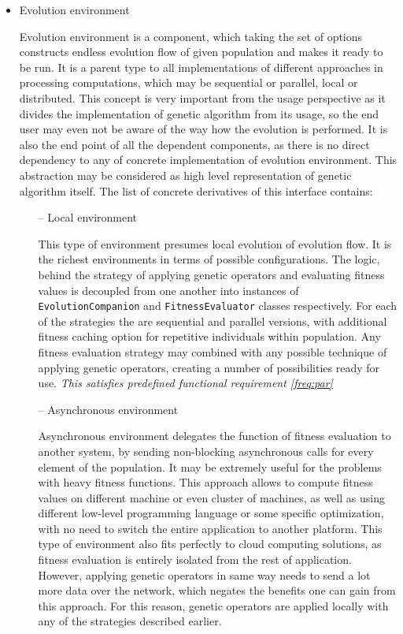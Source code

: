 \begin{itemize}
\item
Evolution environment

Evolution environment is a component, which taking the set of options constructs endless evolution flow of given population and makes it ready to be run. It is a parent type to all implementations of different approaches in processing computations, which may be sequential or parallel, local or distributed. This concept is very important from the usage perspective as it divides the implementation of genetic algorithm from its usage, so the end user may even not be aware of the way how the evolution is performed. It is also the end point of all the dependent components, as there is no direct dependency to any of concrete implementation of evolution environment. This abstraction may be considered as high level representation of genetic algorithm itself. The list of concrete derivatives of this interface contains:
\begin{itemize}
\item[--]
Local environment

This type of environment presumes local evolution of evolution flow. It is the richest environments in terms of possible configurations. The logic, behind the strategy of applying genetic operators and evaluating fitness values is decoupled from one another into instances of \texttt{EvolutionCompanion} and \texttt{FitnessEvaluator} classes respectively. For each of the strategies the are sequential and parallel versions, with additional fitness caching option for repetitive individuals within population. Any fitness evaluation strategy may combined with any possible technique of applying genetic operators, creating a number of possibilities ready for use.
\smallskip\textit{This satisfies predefined functional requirement \ref{freq:par}}
\medbreak

\item[--]
Asynchronous environment

Asynchronous environment delegates the function of fitness evaluation to another system, by sending non-blocking asynchronous calls for every element of the population. It may be extremely useful for the problems with heavy fitness functions. This approach allows to compute fitness values on different machine or even cluster of machines, as well as using different low-level programming language or some specific optimization, with no need to switch the entire application to another platform. This type of environment also fits perfectly to cloud computing solutions, as fitness evaluation is entirely isolated from the rest of application. However, applying genetic operators in same way needs to send a lot more data over the network, which negates the benefits one can gain from this approach. For this reason, genetic operators are applied locally with any of the strategies described earlier.


\end{itemize}
\end{itemize}
